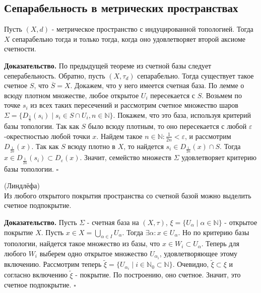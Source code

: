 \subsection{Сепарабельность в метрических пространствах}
\begin{theor}
Пусть $(X,d)$ - метрическое пространство с индуцированной топологией. 
Тогда $X$ сепарабельно тогда и только тогда, когда оно удовлетворяет
второй аксиоме счетности. 
\end{theor}
\textbf{Доказательство.} По предыдущей теореме из счетной базы следует
сеперабельность. Обратно, пусть $(X,\tau_d)$ сепарабельно. Тогда существует
такое счетное $S$, что  $\overline{S}=X$. Докажем, что у него имеется счетная 
база. По лемме о всюду плотном множестве, любое открытое $U_i$ пересекается
с $S$. Возьмем по точке $s_i$ из всех таких пересечений и рассмотрим счетное 
множество шаров  $\Sigma=\{D_{\frac{1}{n}}(s_i)\mid s_i\in S\cap U_i,
n\in \mathbb{N}\}$. Покажем, что это база, используя критерий базы топологии. 
Так как $S$ было всюду плотным, то оно пересекается с любой
$\varepsilon$-окрестностью любой точки $x$. Найдем такое $n\in \mathbb{N}:
\frac{1}{2n}<\varepsilon$, и рассмотрим $D_{\frac{1}{2n}}(x)$. Так как
$S$ всюду плотно в $X$, то найдется $s_i\in D_{\frac{1}{2n}}(x)\cap S$. Тогда
$x\in D_{\frac{1}{2n}}(s_i)\subset D_\varepsilon(x)$. 
Значит, семейство множеств
$\Sigma$ удовлетворяет критерию базы топологии. $\square$ 
\begin{theor}
(Линдлёфа)\\
Из любого открытого покрытия пространства со счетной базой можно выделить
счетное подпокрытие. 
\end{theor}
\textbf{Доказательство.} Пусть $\Sigma$ - счетная база на $(X,\tau)$,
$\xi=\{U_{\alpha}\mid \alpha\in \mathbb{N}\}$ - 
открытое покрытие $X$. Пусть  $x\in X=\bigcup\limits_{\alpha\in I}
U_\alpha$. Тогда $\exists \alpha:x\in U_\alpha$. Но по критерию базы
топологии, найдется такое множество из базы, что $x\in W_i\subset U_\alpha$.
Теперь для любого  $W_i$ выберем одно открытое множество  $U_{\alpha_i}$,
удовлетворяющее этому включению. Рассмотрим теперь 
$\tilde\xi=\{U_{\alpha_i}\mid i\in \mathbb{N}_0\subset \mathbb{N}\}$.
Очевидно, $\tilde\xi\subset \xi$ и согласно включению $\tilde\xi$ - покрытие.
По построению, оно счетное. Значит, это счетное подпокрытие. $\square$ \\
